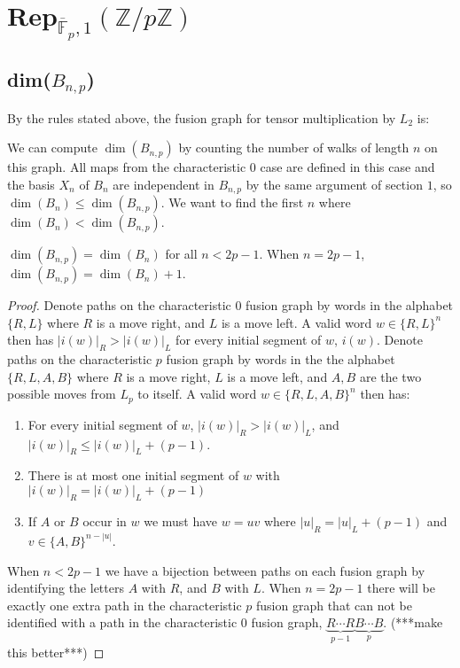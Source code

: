 \documentclass[11pt]{article} %
\begin{document}
\section{Rep$_{\overline{\mathbb{F}}_p,1}(\mathbb{Z}/p\mathbb{Z})$}
\newcommand{\fpbar}{\overline{\mathbb{F}}_p}



\subsection{dim($B_{n,p}$)}

By the rules stated above, the fusion graph for tensor multiplication by $L_2$ is: 



We can compute $\dim(B_{n,p})$ by counting the number of walks of length $n$ on this graph. All maps from the characteristic $0$ case are defined in this case and the basis $X_n$ of $B_n$ are independent in $B_{n,p}$ by the same argument of section $1$, so $\dim(B_n) \leq \dim(B_{n,p})$. We want to find the first $n$ where $\dim(B_n) < \dim(B_{n,p})$.

\begin{proposition}
$\dim(B_{n,p}) = \dim(B_n)$ for all $n < 2p-1$. When $n=2p-1$, $\dim(B_{n,p}) = \dim(B_n) + 1$.
\begin{proof} 
Denote paths on the characteristic $0$ fusion graph by words in the alphabet $\{R,L\}$ where $R$ is a move right, and $L$ is a move left. A valid word $w \in \{R,L\}^{n}$ then has $|i(w)|_{R}>|i(w)|_{L}$ for every initial segment of $w$, $i(w)$. Denote paths on the characteristic $p$ fusion graph by words in the the alphabet $\{R,L,A,B\}$ where $R$ is a move right, $L$ is a move left, and $A,B$ are the two possible moves from $L_p$ to itself. A valid word $w \in \{R,L,A,B\}^n$ then has:
\begin{enumerate}
\item For every initial segment of $w$, $|i(w)|_{R} > |i(w)|_{L}$, and $|i(w)|_R \leq |i(w)|_L + (p-1)$.
\item There is at most one initial segment of $w$ with $|i(w)|_R = |i(w)|_L + (p-1)$
\item If $A$ or $B$ occur in $w$ we must have $w = uv$ where $|u|_R = |u|_L + (p-1)$ and $v \in \{A,B\}^{n-|u|}$. 
\end{enumerate}
When $n<2p-1$ we have a bijection between paths on each fusion graph by identifying the letters $A$ with $R$, and $B$ with $L$. When $n=2p-1$ there will be exactly one extra path in the characteristic $p$ fusion graph that can not be identified with a path in the characteristic $0$ fusion graph, $\underbrace{R\cdots R}_{p-1}\underbrace{B\cdots B}_{p}$. (***make this better***)

\end{proof} 
\end{proposition} 
\end{document}
